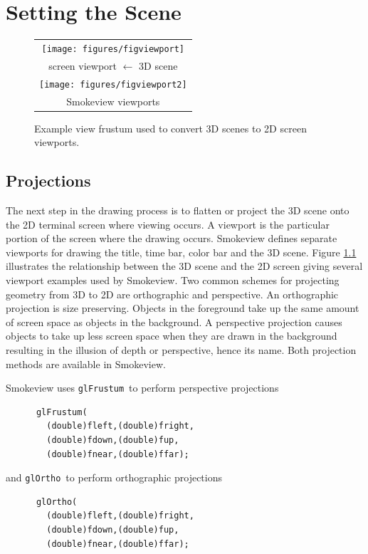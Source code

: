 \documentclass[11pt,twoside]{book}
\begin{document}
\chapter{Setting the Scene}
\begin{figure}[t]
\begin{center}
\begin{tabular}{c}
\texttt{[image: figures/figviewport]}\\
screen viewport $\leftarrow$ 3D scene\\
\texttt{[image: figures/figviewport2]}\\
Smokeview viewports\\
\end{tabular}
\end{center}
\caption{Example view frustum used to convert 3D scenes to 2D
screen viewports.}
 \label{figviewports}
\end{figure}
\section{Projections}
The next step in the drawing process is to flatten or project the
3D scene onto the 2D terminal screen where viewing occurs. A
viewport is the particular portion of the screen where the drawing
occurs.  Smokeview defines separate viewports for drawing the
title, time bar, color bar and the 3D scene.  Figure
\ref{figviewports} illustrates the relationship between the 3D
scene and the 2D screen giving several viewport examples used by
Smokeview. Two common schemes for projecting geometry from 3D to
2D  are orthographic and perspective. An orthographic projection
is size preserving. Objects in the foreground take up the same
amount of screen space as objects in the background. A perspective
projection causes objects to take up less screen space when they
are drawn in the background resulting in the illusion of depth or
perspective, hence its name. Both projection methods are available
in Smokeview.

Smokeview uses {\tt glFrustum}\ to perform perspective projections
\begin{verbatim}
      glFrustum(
        (double)fleft,(double)fright,
        (double)fdown,(double)fup,
        (double)fnear,(double)ffar);
\end{verbatim}
and {\tt glOrtho}\ to perform orthographic projections
\begin{verbatim}
      glOrtho(
        (double)fleft,(double)fright,
        (double)fdown,(double)fup,
        (double)fnear,(double)ffar);
\end{verbatim}
\end{document}
